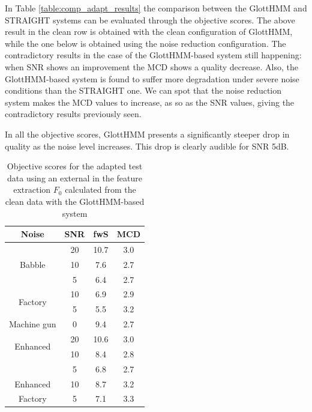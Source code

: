 In Table \ref{table:comp_adapt_results} the comparison between the GlottHMM and STRAIGHT systems can be evaluated through the objective scores.
%
The above result in the clean row is obtained with the clean configuration of GlottHMM, while the one below is obtained using the noise reduction configuration.
%
The contradictory results in the case of the GlottHMM-based system still happening: when SNR shows an improvement the MCD shows a quality decrease.
%
Also, the GlottHMM-based system is found to suffer more degradation under severe noise conditions than the STRAIGHT one.
%
We can spot that the noise reduction system makes the MCD values to increase, as so as the SNR values, giving the contradictory results previously seen.

In all the objective scores, GlottHMM presents a significantly steeper drop in quality as the noise level increases.
%
This drop is clearly audible for SNR 5dB. 

\begin{table}[!htb]
\begin{center}
\begin{tabular}{c c | c | c}
Noise & SNR & fwS & MCD\\
\midrule
\midrule
\multirow{3}{*}{Babble} & 20 & 10.7 & 3.0\\
 & 10 & 7.6 & 2.7\\
 & 5 & 6.4 & 2.7\\
\midrule
\multirow{2}{*}{Factory} & 10 & 6.9 & 2.9\\
 & 5 & 5.5 & 3.2\\
\midrule
Machine gun & 0 & 9.4 & 2.7\\
\midrule
\midrule
\multirow{2}{*}{Enhanced} & 20 & 10.6 & 3.0\\
\multirow{2}{*}{Babble} & 10 & 8.4 & 2.8\\
& 5 & 6.8 & 2.7\\
\midrule
Enhanced & 10 & 8.7 & 3.2\\
Factory & 5 & 7.1 & 3.3\\
\bottomrule
\end{tabular}
\caption{Objective scores for the adapted test data using an external in the feature extraction $F_{0}$ calculated from the clean data with the GlottHMM-based system}
\label{table:results_ext_f0_glott}
\end{center}
\end{table}

